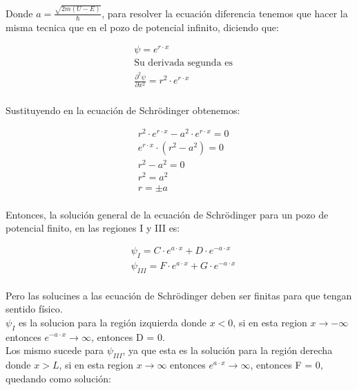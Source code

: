 \documentclass[a4paper]{article}
\begin{document}
            \indent Donde $a = \frac{\sqrt{2m(U - E)}}{\hbar}$, para resolver la ecuación diferencia tenemos que hacer la misma tecnica que en el pozo de potencial infinito, diciendo que:

            \begin{align*}
                &\psi = e^{r \cdot x} \\
                &\text{Su derivada segunda es} \\
                &\frac{\partial^2 \psi} {\partial x^2} = r^2 \cdot e^{r \cdot x} \\
            \end{align*}

            \indent Sustituyendo en la ecuación de Schrödinger obtenemos:

            \saltoPag

            \begin{align*}
                &r^2 \cdot e^{r \cdot x} - a^2 \cdot e^{r \cdot x} = 0 \\
                &e^{r \cdot x} \cdot (r^2 - a^2) = 0 \\
                &r^2 - a^2 = 0 \\
                &r^2 = a^2 \\
                &r = \pm a \\
            \end{align*}

            \indent Entonces, la solución general de la ecuación de Schrödinger para un pozo de potencial finito, en las regiones I y III es:

            \begin{align*}
                &\psi_I = C \cdot e^{a \cdot x} + D \cdot e^{-a \cdot x} \\ 
                &\psi_{III} = F \cdot e^{a \cdot x} + G \cdot e^{-a \cdot x} \\
            \end{align*}

            \indent Pero las solucines a las ecuación de Schrödinger deben ser finitas para que tengan sentido físico.\\
            \indent $\psi_I$  es la solucion para la región izquierda donde $x < 0$, si en esta region $x \rightarrow -\infty$ entonces $e^{-a \cdot x} \rightarrow \infty$, entonces D = 0.\\
            \indent Los mismo sucede para $\psi_{III}$, ya que esta es la solución para la región derecha donde $x > L$, si en esta region $x \rightarrow \infty$ entonces $e^{a \cdot x} \rightarrow \infty$, entonces F = 0, quedando como solución:\\
\end{document}
